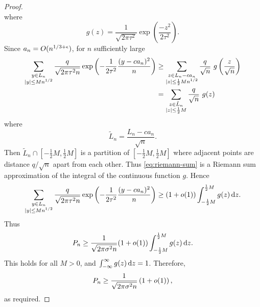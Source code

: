 \begin{proof}
\begin{equation*}
    \end{equation*}
    where
    \begin{equation*}
        g(z) = \frac{1}{\sqrt{2 \pi \tau^2}} \exp\left( \frac{-z^2}{2 \tau^2} \right).
    \end{equation*}
    Since $a_n = O(n^{1/3 + \epsilon})$, for $n$ sufficiently large
    \begin{align}
        \sum_{\substack{y \in L_n \\ \lvert y\rvert \leq M n^{1/2}}}
        \frac{q}{\sqrt{2 \pi \tau^2 n}} \exp \left( - \frac{1}{2 \tau^2} \frac{(y - ca_n)^2}{n} \right)
        &\geq \sum_{\substack{z \in L_n - ca_n\\ \lvert z\rvert \leq \frac{1}{2} M n^{1/2}}} 
        \frac{q}{\sqrt{n}}\ g \left( \frac{z}{\sqrt{n}} \right) \\
        &= \sum_{\substack{z \in \tilde{L}_n \\ \lvert z\rvert \leq \frac{1}{2} M }}
        \frac{q}{\sqrt{n}}\ g(z) \label{eq:riemann-sum}
    \end{align}
    where
    \begin{equation*}
        \tilde{L}_n = \frac{L_n - ca_n}{\sqrt{n}}.
    \end{equation*}
    Then $\tilde{L}_n \cap [-\frac{1}{2}M, \frac{1}{2}M]$ is a partition of $[-\frac{1}{2}M, \frac{1}{2}M]$ where adjacent points are distance $q/\sqrt{n}$ apart from each other. Thus \cref{eq:riemann-sum} is a Riemann sum approximation of the integral of the continuous function $g$. Hence
    \begin{equation*}
        \sum_{\substack{y \in L_n \\ \lvert y\rvert \leq M n^{1/2}}}
        \frac{q}{\sqrt{2 \pi \tau^2 n}} \exp \left( - \frac{1}{2 \tau^2} \frac{(y - ca_n)^2}{n} \right)
        \geq (1 + o(1)) \int_{-\frac{1}{2} M}^{\frac{1}{2}M} g(z) \mathop{}\!\mathrm{d} z.
    \end{equation*}
    Thus
    \begin{equation*}
        P_n \geq \frac{1}{\sqrt{2 \pi \sigma^2 n}} (1 + o(1)) \int_{-\frac{1}{2} M}^{\frac{1}{2}M} g(z) \mathop{}\!\mathrm{d} z.
    \end{equation*}
    This holds for all $M > 0$, and $\int_{-\infty}^{\infty} g(z) \mathop{}\!\mathrm{d} z = 1$. Therefore,
    \begin{equation*}
        P_n \geq \frac{1}{\sqrt{2 \pi \sigma^2 n}} \left( 1 + o(1) \right),
    \end{equation*}
    as required.
\end{proof}


